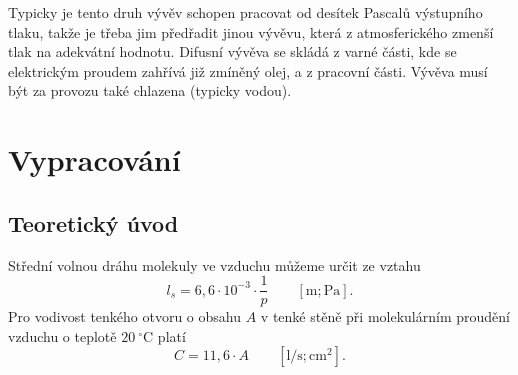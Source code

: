 \documentclass[english]{article}
\newcommand{\unit}[1]{~\mathrm{#1}}
\newcommand{\unitbr}[1]{\qquad\mathrm{[#1]}}
\begin{document}
Typicky je tento druh vývěv schopen pracovat od desítek Pascalů výstupního tlaku, takže je třeba jim předřadit jinou vývěvu, která z atmosferického zmenší tlak na adekvátní hodnotu. Difusní vývěva se skládá z varné části, kde se elektrickým proudem zahřívá již zmíněný olej, a z pracovní části. Vývěva musí být za provozu také chlazena (typicky vodou). 

\section{Vypracování}
  \subsection{Teoretický úvod}
  	Střední volnou dráhu molekuly ve vzduchu můžeme určit ze vztahu
	\begin{equation}
		l_{s}=6,6\cdot10^{-3}\cdot\frac{1}{p}\unitbr{m;Pa}.
	\label{eq:ls}
	\end{equation}
  	Pro vodivost tenkého otvoru o obsahu $A$ v tenké stěně při molekulárním proudění vzduchu o teplotě $20\unit{^\circ C}$ platí
  	\begin{equation}
  		C = 11,6\cdot A\unitbr{l/s;cm^2}.
  	\label{eq:Cm}
  	\end{equation}
  	
\end{document}
